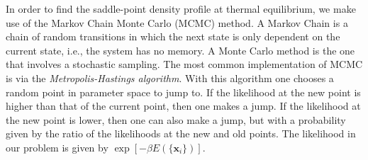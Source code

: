 \documentclass[11pt]{article}
\begin{document}
In order to find the saddle-point density profile at thermal equilibrium, we make use of the Markov Chain Monte Carlo (MCMC) method. A Markov Chain is a chain of random transitions in which the next state is only dependent on the current state, i.e., the system has no memory. A Monte Carlo method is the one that involves a stochastic sampling. The most common implementation of MCMC is via the \textit{Metropolis-Hastings algorithm}. With this algorithm one chooses a random point in parameter space to jump to. If the likelihood at the new point is higher than that of the current point, then one makes a jump. If the likelihood at the new point is lower, then one can also make a jump, but with a probability given by the ratio of the likelihoods at the new and old points. The likelihood in our problem is given by $\exp[-\beta E(\{\textbf{x}_i\})]$. 
\end{document}
